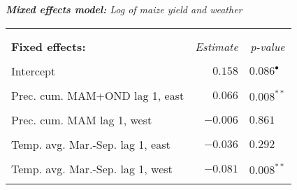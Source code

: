 \documentclass[a4paper,12pt]{article}
\begin{document}
{\centering
\begin{threeparttable}


\singlespacing
\caption{\textit{\textbf{Mixed  effects model:} Log of maize yield and weather}}
\label{Peggy45ln} 
\centering
\begin{small}
\begin{tabular}{lrl} 
\hline \vspace{-0.2cm} \\
  
\vspace{-0.2cm} \\

  
  \multicolumn{1}{l}{\vspace{0.1cm}\textbf{Fixed effects:}}  &\multicolumn{1}{c}{\textit{Estimate}} &\multicolumn{1}{c}{\textit{p-value}}\\
 \hline 
\hline
\\
\vspace{-0.2cm}Intercept&$0.158$&$0.086^{\bullet}$\\
  \\
\vspace{-0.2cm}Prec. cum. MAM+OND lag 1, east&$0.066$&$0.008^{**}$\\
  \\
  \vspace{-0.2cm}Prec. cum. MAM lag 1, west&$-0.006$&$0.861$\\
  \\
  \vspace{-0.2cm}Temp. avg. Mar.-Sep. lag 1, east&$-0.036$&$0.292$\\
  \\
    \vspace{-0.2cm}Temp. avg. Mar.-Sep. lag 1, west&$-0.081$&$0.008^{**}$\\
  \\
  

\end{tabular}
\end{small}
\end{threeparttable}}
\end{document}
